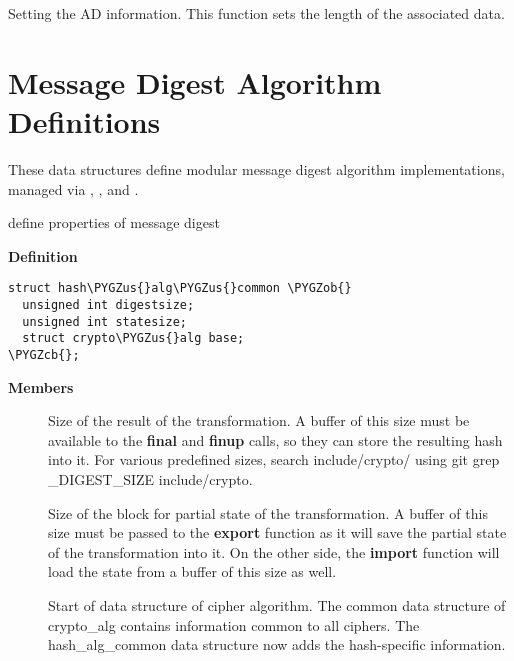 \documentclass[a4paper,8pt,english]{sphinxmanual}
\def\PYGZus{\char`\_}
\def\PYGZob{\char`\{}
\def\PYGZcb{\char`\}}
\begin{document}
Setting the AD information.  This function sets the length of
the associated data.


\section{Message Digest Algorithm Definitions}
\label{crypto/api-digest:message-digest-algorithm-definitions}\label{crypto/api-digest::doc}
These data structures define modular message digest algorithm
implementations, managed via ,
,  and
.

\begin{fulllineitems}
\label{crypto/api-digest:c.hash_alg_common}
define properties of message digest

\end{fulllineitems}


\textbf{Definition}

\begin{Verbatim}[commandchars=\\\{\}]
struct hash\PYGZus{}alg\PYGZus{}common \PYGZob{}
  unsigned int digestsize;
  unsigned int statesize;
  struct crypto\PYGZus{}alg base;
\PYGZcb{};
\end{Verbatim}

\textbf{Members}
\begin{description}
\item[{}] \leavevmode
Size of the result of the transformation. A buffer of this size
must be available to the \textbf{final} and \textbf{finup} calls, so they can
store the resulting hash into it. For various predefined sizes,
search include/crypto/ using
git grep \_DIGEST\_SIZE include/crypto.

\item[{}] \leavevmode
Size of the block for partial state of the transformation. A
buffer of this size must be passed to the \textbf{export} function as it
will save the partial state of the transformation into it. On the
other side, the \textbf{import} function will load the state from a
buffer of this size as well.

\item[{}] \leavevmode
Start of data structure of cipher algorithm. The common data
structure of crypto\_alg contains information common to all ciphers.
The hash\_alg\_common data structure now adds the hash-specific
information.

\end{description}
\end{document}

